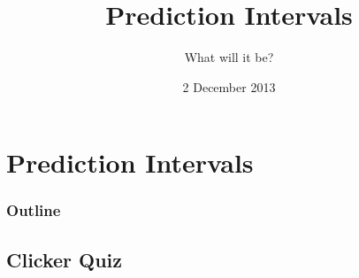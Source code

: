 
\section{Prediction Intervals}

\title{Prediction Intervals}
\subtitle{What will it be?}

\date{2 December 2013}

\begin{frame}
  \titlepage
\end{frame}

\begin{frame}
  \frametitle{Outline}
  \tableofcontents[hideothersubsections,sectionstyle=show/hide]
\end{frame}


\subsection{Clicker Quiz}


